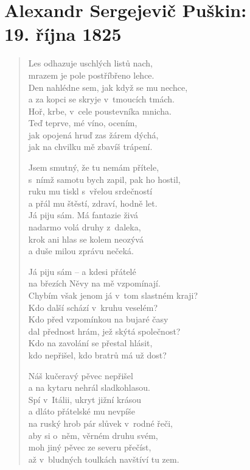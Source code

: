  \section{Alexandr Sergejevič Puškin:\\19. října 1825} 

\begin{verse}
Les odhazuje uschlých listů nach,\\
mrazem je pole postříbřeno lehce.\\
Den nahlédne sem, jak když se mu nechce,\\
a za kopci se skryje v~tmoucích tmách.\\
Hoř, krbe, v~cele poustevníka mnicha.\\
Teď teprve, mé víno, ocením,\\
jak opojená hruď zas žárem dýchá,\\
jak na chvilku mě zbavíš trápení.

\medskip

Jsem smutný, že tu nemám přítele,\\
s~nímž samotu bych zapil, pak ho hostil,\\
ruku mu tiskl s~vřelou srdečností\\
a přál mu štěstí, zdraví, hodně let.\\
Já piju sám. Má fantazie živá\\
nadarmo volá druhy z~daleka,\\
krok ani hlas se kolem neozývá\\
a duše milou zprávu nečeká.

\medskip

Já piju sám -- a kdesi přátelé\\
na březích Něvy na mě vzpomínají.\\
Chybím však jenom já v~tom slastném kraji?\\
Kdo další schází v~kruhu veselém?\\
Kdo před vzpomínkou na bujaré časy\\
dal přednost hrám, jež skýtá společnost?\\
Kdo na zavolání se přestal hlásit,\\
kdo nepřišel, kdo bratrů má už dost?

\medskip

Náš kučeravý pěvec nepřišel\\
a na kytaru nehrál sladkohlasou.\\
Spí v~Itálii, ukryt jižní krásou\\
a dláto přátelské mu nevpíše\\
na ruský hrob pár slůvek v~rodné řeči,\\
aby si o~něm, věrném druhu svém,\\
moh jiný pěvec ze severu přečíst,\\
až v~bludných toulkách navštíví tu zem.


\end{verse}
